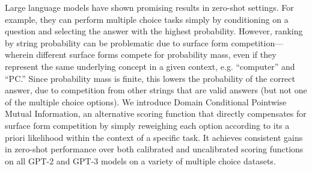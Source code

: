 Large language models have shown promising results in zero-shot settings. For example, they can perform multiple choice tasks simply by conditioning on a question and selecting the answer with the highest probability. However, ranking by string probability can be problematic due to surface form competition—wherein different surface forms compete for probability mass, even if they represent the same underlying concept in a given context, e.g. ``computer'' and ``PC.'' Since probability mass is finite, this lowers the probability of the correct answer, due to competition from other strings that are valid answers (but not one of the multiple choice options). We introduce Domain Conditional Pointwise Mutual Information, an alternative scoring function that directly compensates for surface form competition by simply reweighing each option according to its a priori likelihood within the context of a specific task. It achieves consistent gains in zero-shot performance over both calibrated and uncalibrated scoring functions on all GPT-2 and GPT-3 models on a variety of multiple choice datasets.
